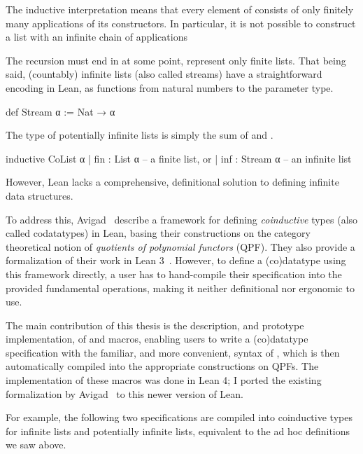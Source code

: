The inductive interpretation means that every element of  consists of only
finitely many applications of its constructors. In particular, it is not possible
to construct a list with an infinite chain of  applications
\begin{center}
\end{center}
The recursion must end in  at some point,  represent only finite lists.
That being said, (countably) infinite lists (also called streams) have a straightforward encoding in Lean, as functions from natural numbers to the parameter type.
\begin{leancode}
    def Stream α := Nat → α
\end{leancode}

The type of potentially infinite lists is simply the sum of  and .
\begin{leancode}
  inductive CoList α
    | fin : List α      -- a finite list, or
    | inf : Stream α    -- an infinite list
\end{leancode}

However, Lean lacks a comprehensive, definitional solution to defining infinite data structures.

To address this, Avigad \etal{}\ describe a framework for defining \emph{coinductive} types (also called codatatypes) in Lean,
basing their constructions on the category theoretical notion of \emph{quotients of polynomial functors} (QPF).
They also provide a formalization of their work in Lean 3~\cite{avigadDataTypesQuotients2019a}.
However, to define a (co)datatype using this framework directly, a user has to hand-compile their specification 
into the provided fundamental operations, making it neither definitional nor ergonomic to use.

The main contribution of this thesis is the description, and prototype implementation, of \data{} and \codata{} macros, enabling users to write a (co)datatype specification with the familiar, and more convenient, syntax of \inductive{}, which is then automatically compiled into the appropriate constructions on QPFs.
The implementation of these macros was done in Lean 4; I ported the existing formalization by Avigad \etal\ to this newer version of Lean.


For example, the following two \codata{} specifications are compiled into coinductive types for infinite lists and potentially infinite lists, equivalent to the ad hoc definitions we saw above.

